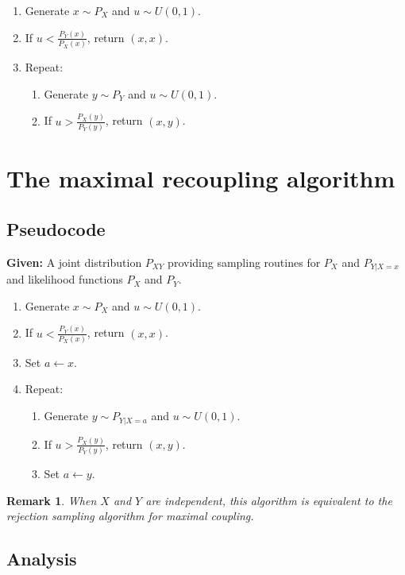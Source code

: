 \documentclass{article}
\newtheorem{remark}{Remark}
\begin{document}
\begin{enumerate}
    \item Generate \(x \sim P_X\) and \(u \sim U(0,1)\).
    \item If \(u < \frac{P_Y(x)}{P_X(x)}\), return \((x, x)\).
    \item Repeat:
    \begin{enumerate}
        \item Generate \(y \sim P_Y\) and \(u \sim U(0,1)\).
        \item If \(u > \frac{P_X(y)}{P_Y(y)}\), return \((x, y)\).
    \end{enumerate}
\end{enumerate}

\section*{The maximal recoupling algorithm}

\subsection*{Pseudocode}

\noindent\textbf{Given:} A joint distribution \(P_{XY}\) providing sampling routines for \(P_X\) and \(P_{Y|X=x}\) and likelihood functions \(P_X\) and \(P_Y\).

\begin{enumerate}
    \item Generate \(x \sim P_X\) and \(u \sim U(0,1)\).
    \item If \(u < \frac{P_Y(x)}{P_X(x)}\), return \((x, x)\).
    \item Set \(a \gets x\).
    \item Repeat:
    \begin{enumerate}
        \item Generate \(y \sim P_{Y|X=a}\) and \(u \sim U(0,1)\).
        \item If \(u > \frac{P_X(y)}{P_Y(y)}\), return \((x, y)\).
        \item Set \(a \gets y\).
    \end{enumerate}
\end{enumerate}

\begin{remark}
    When $X$ and $Y$ are independent, this algorithm is equivalent to the rejection sampling
    algorithm for maximal coupling.
\end{remark}

\subsection*{Analysis}
\end{document}
